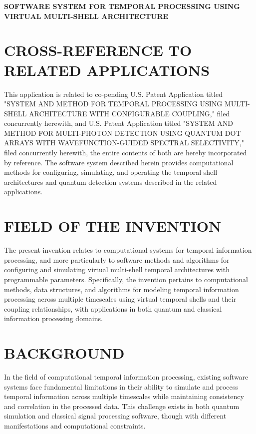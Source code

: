 \documentclass[12pt,letterpaper]{article}
\begin{document}
\begin{center}
\Large\bfseries
SOFTWARE SYSTEM FOR TEMPORAL PROCESSING USING VIRTUAL MULTI-SHELL ARCHITECTURE
\end{center}

\vspace{0.5in}

\vspace{1in}

\section*{CROSS-REFERENCE TO RELATED APPLICATIONS}

This application is related to co-pending U.S. Patent Application titled "SYSTEM AND METHOD FOR TEMPORAL PROCESSING USING MULTI-SHELL ARCHITECTURE WITH CONFIGURABLE COUPLING," filed concurrently herewith, and U.S. Patent Application titled "SYSTEM AND METHOD FOR MULTI-PHOTON DETECTION USING QUANTUM DOT ARRAYS WITH WAVEFUNCTION-GUIDED SPECTRAL SELECTIVITY," filed concurrently herewith, the entire contents of both are hereby incorporated by reference. The software system described herein provides computational methods for configuring, simulating, and operating the temporal shell architectures and quantum detection systems described in the related applications.

\section*{FIELD OF THE INVENTION}

The present invention relates to computational systems for temporal information processing, and more particularly to software methods and algorithms for configuring and simulating virtual multi-shell temporal architectures with programmable parameters. Specifically, the invention pertains to computational methods, data structures, and algorithms for modeling temporal information processing across multiple timescales using virtual temporal shells and their coupling relationships, with applications in both quantum and classical information processing domains.

\section*{BACKGROUND}

In the field of computational temporal information processing, existing software systems face fundamental limitations in their ability to simulate and process temporal information across multiple timescales while maintaining consistency and correlation in the processed data. This challenge exists in both quantum simulation and classical signal processing software, though with different manifestations and computational constraints.
\end{document}
